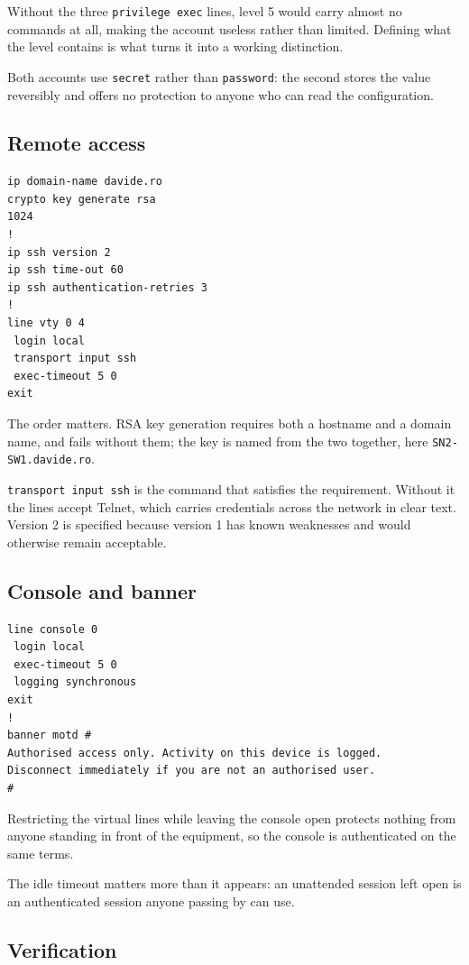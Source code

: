 \documentclass[12pt,a4paper]{article}
\begin{document}
Without the three \texttt{privilege exec} lines, level 5 would carry almost no
commands at all, making the account useless rather than limited. Defining what
the level contains is what turns it into a working distinction.

Both accounts use \texttt{secret} rather than \texttt{password}: the second
stores the value reversibly and offers no protection to anyone who can read the
configuration.

\subsection{Remote access}

\begin{lstlisting}
ip domain-name davide.ro
crypto key generate rsa
1024
!
ip ssh version 2
ip ssh time-out 60
ip ssh authentication-retries 3
!
line vty 0 4
 login local
 transport input ssh
 exec-timeout 5 0
exit
\end{lstlisting}

The order matters. RSA key generation requires both a hostname and a domain
name, and fails without them; the key is named from the two together, here
\texttt{SN2-SW1.davide.ro}.

\texttt{transport input ssh} is the command that satisfies the requirement.
Without it the lines accept Telnet, which carries credentials across the
network in clear text. Version 2 is specified because version 1 has known
weaknesses and would otherwise remain acceptable.

\subsection{Console and banner}

\begin{lstlisting}
line console 0
 login local
 exec-timeout 5 0
 logging synchronous
exit
!
banner motd #
Authorised access only. Activity on this device is logged.
Disconnect immediately if you are not an authorised user.
#
\end{lstlisting}

Restricting the virtual lines while leaving the console open protects nothing
from anyone standing in front of the equipment, so the console is authenticated
on the same terms.

The idle timeout matters more than it appears: an unattended session left open
is an authenticated session anyone passing by can use.

\subsection{Verification}
\end{document}
